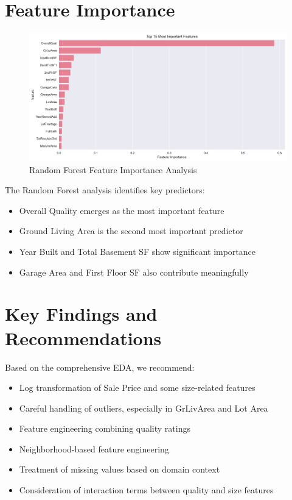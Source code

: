 \documentclass[12pt]{report}
\begin{document}
\section{Feature Importance}
\begin{figure}[H]
    \centering
    \includegraphics[width=1.0\textwidth]{figures/feature_importance.png}
    \caption{Random Forest Feature Importance Analysis}
    \label{fig:feature_importance}
\end{figure}

The Random Forest analysis identifies key predictors:
\begin{itemize}
    \item Overall Quality emerges as the most important feature
    \item Ground Living Area is the second most important predictor
    \item Year Built and Total Basement SF show significant importance
    \item Garage Area and First Floor SF also contribute meaningfully
\end{itemize}

\section{Key Findings and Recommendations}
Based on the comprehensive EDA, we recommend:
\begin{itemize}
    \item Log transformation of Sale Price and some size-related features
    \item Careful handling of outliers, especially in GrLivArea and Lot Area
    \item Feature engineering combining quality ratings
    \item Neighborhood-based feature engineering
    \item Treatment of missing values based on domain context
    \item Consideration of interaction terms between quality and size features
\end{itemize}
\end{document}
